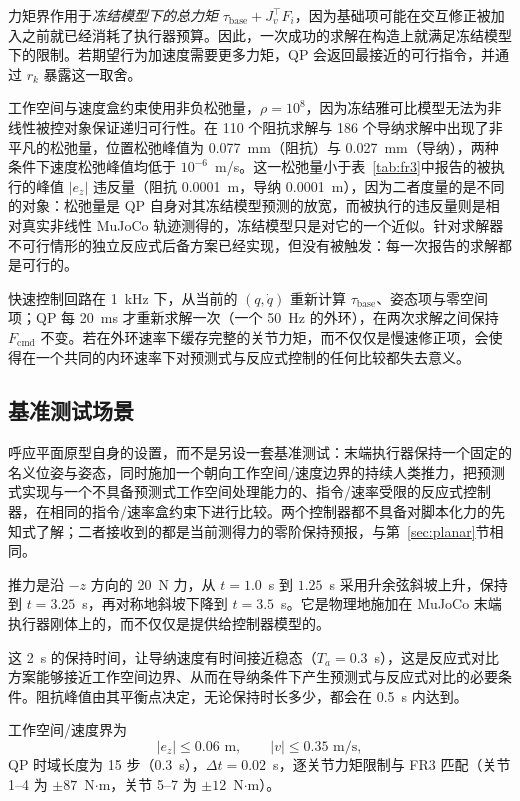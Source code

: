 \documentclass[journal]{IEEEtran}
\begin{document}
力矩界作用于\emph{冻结模型下的总力矩} $\tau_{\mathrm{base}}+J_v^\top F_i$，因为基础项可能在交互修正被加入之前就已经消耗了执行器预算。因此，一次成功的求解在构造上就满足冻结模型下的限制。若期望行为加速度需要更多力矩，QP 会返回最接近的可行指令，并通过 $r_k$ 暴露这一取舍。

工作空间与速度盒约束使用非负松弛量，$\rho=10^8$，因为冻结雅可比模型无法为非线性被控对象保证递归可行性。在 110 个阻抗求解与 186 个导纳求解中出现了非平凡的松弛量，位置松弛峰值为 0.077~mm（阻抗）与 0.027~mm（导纳），两种条件下速度松弛峰值均低于 $10^{-6}$~m/s。这一松弛量小于表~\ref{tab:fr3}中报告的被执行的峰值 $|e_z|$ 违反量（阻抗 0.0001~m，导纳 0.0001~m），因为二者度量的是不同的对象：松弛量是 QP 自身对其冻结模型预测的放宽，而被执行的违反量则是相对真实非线性 MuJoCo 轨迹测得的，冻结模型只是对它的一个近似。针对求解器不可行情形的独立反应式后备方案已经实现，但没有被触发：每一次报告的求解都是可行的。

快速控制回路在 1~kHz 下，从当前的 $(q,\dot q)$ 重新计算 $\tau_{\mathrm{base}}$、姿态项与零空间项；QP 每 20~ms 才重新求解一次（一个 50~Hz 的外环），在两次求解之间保持 $F_{\mathrm{cmd}}$ 不变。若在外环速率下缓存完整的关节力矩，而不仅仅是慢速修正项，会使得在一个共同的内环速率下对预测式与反应式控制的任何比较都失去意义。

\subsection{基准测试场景}

呼应平面原型自身的设置，而不是另设一套基准测试：末端执行器保持一个固定的名义位姿与姿态，同时施加一个朝向工作空间/速度边界的持续人类推力，把预测式实现与一个不具备预测式工作空间处理能力的、指令/速率受限的反应式控制器，在相同的指令/速率盒约束下进行比较。两个控制器都不具备对脚本化力的先知式了解；二者接收到的都是当前测得力的零阶保持预报，与第~\ref{sec:planar}节相同。

推力是沿 $-z$ 方向的 20~N 力，从 $t=1.0$~s 到 $1.25$~s 采用升余弦斜坡上升，保持到 $t=3.25$~s，再对称地斜坡下降到 $t=3.5$~s。它是物理地施加在 MuJoCo 末端执行器刚体上的，而不仅仅是提供给控制器模型的。

这 2~s 的保持时间，让导纳速度有时间接近稳态（$T_a=0.3$~s），这是反应式对比方案能够接近工作空间边界、从而在导纳条件下产生预测式与反应式对比的必要条件。阻抗峰值由其平衡点决定，无论保持时长多少，都会在 0.5~s 内达到。

工作空间/速度界为
\begin{equation}
|e_z|\le0.06\text{ m},\qquad |v|\le0.35\text{ m/s},
\end{equation}
QP 时域长度为 15 步（0.3~s），$\Delta t=0.02$~s，逐关节力矩限制与 FR3 匹配（关节 1--4 为 $\pm87$~N$\cdot$m，关节 5--7 为 $\pm12$~N$\cdot$m）。
\end{document}
